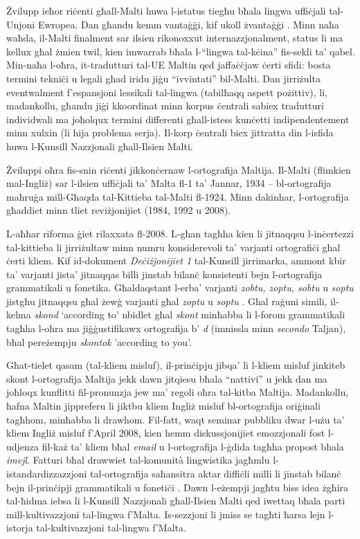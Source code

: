 \begin{multicols}{2}
Żvilupp ieħor riċenti għall-Malti huwa l-istatus tiegħu bħala lingwa uffiċjali tal-Unjoni Ewropea. Dan għandu kemm vantaġġi, kif ukoll żvantaġġi \cite{Fabri:2011a}. Minn naħa waħda, il-Malti finalment sar ilsien rikonoxxut internazzjonalment, status li ma kellux għal żmien twil, kien imwarrab bħala l-``lingwa tal-kċina'' fis-sekli ta’ qabel. Min-naħa l-oħra, it-tradutturi tal-UE Maltin qed jaffaċċjaw ċerti sfidi: bosta termini tekniċi u legali għad iridu jiġu ``ivvintati'' bil-Malti. Dan jirriżulta eventwalment f’espansjoni lessikali tal-lingwa (tabilħaqq aspett pożittiv), li, madankollu, għandu jiġi kkoordinat minn korpus ċentrali sabiex tradutturi individwali ma joħolqux termini differenti għall-istess kunċetti indipendentement minn xulxin (li hija problema serja). Il-korp ċentrali biex jittratta din l-isfida huwa l-Kunsill Nazzjonali għall-Ilsien Malti.

Żviluppi oħra fis-snin riċenti jikkonċernaw l-ortografija Maltija. Il-Malti (flimkien mal-Ingliż) sar l-ilsien uffiċjali ta’ Malta fl-1 ta’ Jannar, 1934 – bl-ortografija maħruġa mill-Għaqda tal-Kittieba tal-Malti fl-1924. Minn dakinhar, l-ortografija għaddiet minn tliet reviżjonijiet (1984, 1992 u 2008).

L-aħħar riforma ġiet rilaxxata fl-2008. L-għan tagħha kien li jitnaqqsu l-inċertezzi tal-kittieba li jirriżultaw minn numru konsiderevoli ta’ varjanti ortografiċi għal ċerti kliem. Kif id-dokument \emph{Deċiżjonijiet 1} \cite{Kunsill:2008a} tal-Kunsill  jirrimarka, ammont kbir ta’ varjanti jista' jitnaqqas billi jinstab bilanċ konsistenti bejn l-ortografija grammatikali u fonetika. Għaldaqstant l-erba’ varjanti \emph{zobtu, zoptu, sobtu} u \emph{soptu} jistgħu jitnaqqsu għal żewġ varjanti għal \emph{zoptu}  u \emph{soptu} . Għal raġuni simili, il-kelma \emph{skond}  `according to' nbidlet għal \emph{skont} minħabba li l-forom grammatikali tagħha l-oħra ma jiġġustifikawx ortografija b’ \emph{d} (imnissla minn \emph{secondo} Taljan), bħal pereżempju \emph{skontok}  'according to you'.

Għat-tielet qasam (tal-kliem misluf), il-prinċipju jibqa’ li l-kliem misluf jinkiteb skont l-ortografija Maltija jekk dawn jitqiesu bħala ``nattivi'' u jekk dan ma joħloqx kunflitti fil-pronunzja jew ma’ regoli oħra tal-kitba Maltija. Madankollu, ħafna Maltin jippreferu li jiktbu kliem Ingliż misluf bl-ortografija oriġinali tagħhom, minħabba li drawhom. Fil-fatt, waqt seminar pubbliku dwar l-użu ta’ kliem Ingliż misluf f'April 2008, kien hemm diskussjonijiet emozzjonali fost l-udjenza fil-każ ta’ kliem bħal \emph{email} u l-ortografija l-ġdida tagħha propost bħala \emph{imejl}. Fatturi bħal drawwiet tal-komunità lingwistika jagħmlu l-istandardizzazzjoni tal-ortografija saħansitra aktar diffiċli milli li jinstab bilanċ bejn il-prinċipji grammatikali u fonetiċi \cite{Kunsill:2008b}.
Dawn l-eżempji jagħtu biss idea żgħira tal-ħidma iebsa li l-Kunsill Nazzjonali għall-Ilsien Malti qed iwettaq bħala parti mill-kultivazzjoni tal-lingwa f'Malta. Is-sezzjoni li jmiss se tagħti ħarsa lejn l-istorja tal-kultivazzjoni tal-lingwa f'Malta.


\end{multicols}
